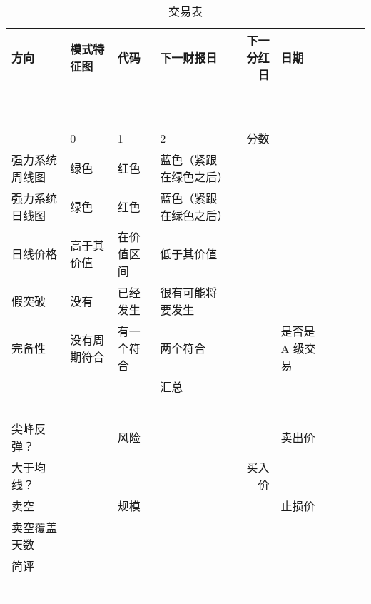 \documentclass{article}
\begin{document}
\begin{table}[!ht]
    \centering
    \caption{交易表}
    \begin{tabularx}{\textwidth}{|X|l|l|X|r|X|ll|}
        \hline
        方向               & 模式特征图  & 代码    & 下一财报日       & 下一分红日 & 日期        & ~ & ~ \\ \hline
        ~                & ~      & ~     & ~           & ~     & ~         & ~ & ~ \\ \hline
        ~                & ~      & ~     & ~           & ~     & ~         & ~ & ~ \\ \hline
        ~                & 0      & 1     & 2           & 分数    & ~         & ~ & ~ \\ \hline
        强力系统周线图          & 绿色     & 红色    & 蓝色（紧跟在绿色之后） & ~     & ~         & ~ & ~ \\ \hline
        强力系统日线图          & 绿色     & 红色    & 蓝色（紧跟在绿色之后） & ~     & ~         & ~ & ~ \\ \hline
        日线价格             & 高于其价值  & 在价值区间 & 低于其价值       & ~     & ~         & ~ & ~ \\ \hline
        假突破              & 没有     & 已经发生  & 很有可能将要发生    & ~     & ~         & ~ & ~ \\ \hline
        完备性              & 没有周期符合 & 有一个符合 & 两个符合        & ~     & 是否是 A 级交易 & ~ & ~ \\ \hline
        ~                & ~      & ~     & 汇总          & ~     & ~         & ~ & ~ \\ \hline
        ~                & ~      & ~     & ~           & ~     & ~         & ~ & ~ \\ \hline
        尖峰反弹？            & ~      & 风险    & ~           & ~     & 卖出价       & ~ & ~ \\ \hline
        大于均线？            & ~      & ~     & ~           & 买入价   & ~         & ~ & ~ \\ \hline
        卖空               & ~      & 规模    & ~           & ~     & 止损价       & ~ & ~ \\ \hline
        卖空覆盖天数           & ~      & ~     & ~           & ~     & ~         & ~ & ~ \\ \hline
        简评               & ~      & ~     & ~           & ~     & ~         & ~ & ~ \\ \hline
        ~                & ~      & ~     & ~           & ~     & ~         & ~ & ~ \\ \hline

\end{tabularx}
\end{table}
\end{document}
